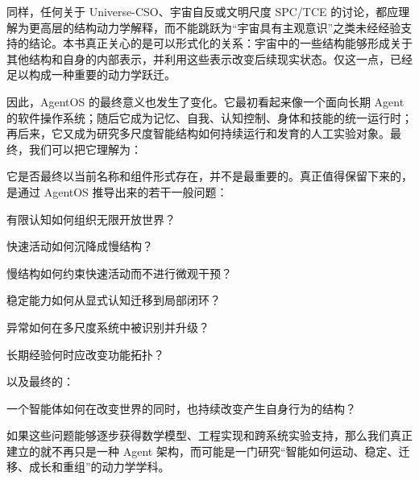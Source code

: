 同样，任何关于 Universe-CSO、宇宙自反或文明尺度 SPC/TCE 的讨论，都应理解为更高层的结构动力学解释，而不能跳跃为“宇宙具有主观意识”之类未经经验支持的结论。本书真正关心的是可以形式化的关系：宇宙中的一些结构能够形成关于其他结构和自身的内部表示，并利用这些表示改变后续现实状态。仅这一点，已经足以构成一种重要的动力学跃迁。

因此，AgentOS 的最终意义也发生了变化。它最初看起来像一个面向长期 Agent 的软件操作系统；随后它成为记忆、自我、认知控制、身体和技能的统一运行时；再后来，它又成为研究多尺度智能结构如何持续运行和发育的人工实验对象。最终，我们可以把它理解为：
\begin{statementbox}
\centering
{}
\end{statementbox}

它是否最终以当前名称和组件形式存在，并不是最重要的。真正值得保留下来的，是通过 AgentOS 推导出来的若干一般问题：

\begin{statementbox}
有限认知如何组织无限开放世界？
\end{statementbox}

\begin{statementbox}
快速活动如何沉降成慢结构？
\end{statementbox}

\begin{statementbox}
慢结构如何约束快速活动而不进行微观干预？
\end{statementbox}

\begin{statementbox}
稳定能力如何从显式认知迁移到局部闭环？
\end{statementbox}

\begin{statementbox}
异常如何在多尺度系统中被识别并升级？
\end{statementbox}

\begin{statementbox}
长期经验何时应改变功能拓扑？
\end{statementbox}

以及最终的：

\begin{statementbox}
一个智能体如何在改变世界的同时，也持续改变产生自身行为的结构？
\end{statementbox}

如果这些问题能够逐步获得数学模型、工程实现和跨系统实验支持，那么我们真正建立的就不再只是一种 Agent 架构，而可能是一门研究“智能如何运动、稳定、迁移、成长和重组”的动力学学科。

